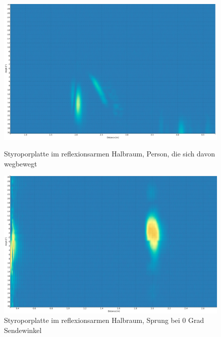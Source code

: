 \clearpage
\begin{figure}[htb]
\begin{minipage}{1.0\textwidth}
\includegraphics[width=\textwidth]{graphics/image_appendix_bild_0.png}
\caption{Styroporplatte im reflexionsarmen Halbraum, Person, die sich davon wegbewegt} %
\label{fig:image_appendix_bild_0}
%
\end{minipage}
\begin{minipage}{1.0\textwidth}
\includegraphics[width=\textwidth]{graphics/image_appendix_bild_1.png}
\caption{Styroporplatte im reflexionsarmen Halbraum, Sprung bei $0$ Grad Sendewinkel} %
\label{fig:image_appendix_bild_1}
%
\end{minipage}
\end{figure}


